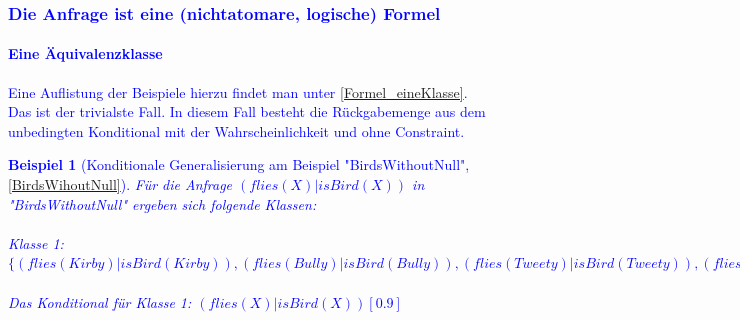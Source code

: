 \documentclass[a4paper, 11pt]{book}
\newtheorem{Bsp}{Beispiel}[section]
\begin{document}
\textcolor{blue}{
\subsubsection{Die Anfrage ist eine (nichtatomare, logische) Formel} \label{KondGen_Formel}
\paragraph{Eine Äquivalenzklasse}
Eine Auflistung der Beispiele hierzu findet man unter \ref{Formel_eineKlasse}.\\
Das ist der trivialste Fall. In diesem Fall besteht die Rückgabemenge aus dem unbedingten Konditional mit der Wahrscheinlichkeit und ohne Constraint.
	\begin{Bsp}[Konditionale Generalisierung am Beispiel "{}BirdsWithoutNull"{}, \ref{BirdsWihoutNull}]
	Für die Anfrage $ (flies(X) | isBird(X))$ in "{}BirdsWithoutNull"{} ergeben sich folgende Klassen:\\
	\\
	Klasse 1: $ \{(flies(Kirby) | isBird(Kirby)), (flies(Bully) | isBird(Bully)), (flies(Tweety) | isBird(Tweety)), (flies(Sylvester) | isBird(Sylvester))\} $\\
	\\
	Das Konditional für Klasse 1: $ (flies(X) | isBird(X))[0.9]$
\end{Bsp}
}
\end{document}
